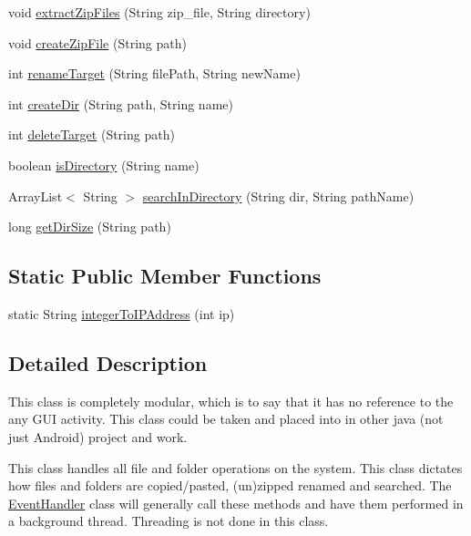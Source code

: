 \begin{DoxyCompactItemize}
\item 
void \hyperlink{classcom_1_1zia_1_1freshdocs_1_1widget_1_1fileexplorer_1_1_file_manager_a8aeb681e45fcce92cc4060ca7139d07d}{extract\-Zip\-Files} (String zip\-\_\-file, String directory)
\item 
void \hyperlink{classcom_1_1zia_1_1freshdocs_1_1widget_1_1fileexplorer_1_1_file_manager_a34589f8be3c60e24457dfa4f4278ef9a}{create\-Zip\-File} (String path)
\item 
int \hyperlink{classcom_1_1zia_1_1freshdocs_1_1widget_1_1fileexplorer_1_1_file_manager_a3f30e730f97184e178ece5f1f472b2d4}{rename\-Target} (String file\-Path, String new\-Name)
\item 
int \hyperlink{classcom_1_1zia_1_1freshdocs_1_1widget_1_1fileexplorer_1_1_file_manager_a6bc5e607bdd04f826f9f1a4a26490373}{create\-Dir} (String path, String name)
\item 
int \hyperlink{classcom_1_1zia_1_1freshdocs_1_1widget_1_1fileexplorer_1_1_file_manager_a820b0bdac17374cb719e83f24fcecfb9}{delete\-Target} (String path)
\item 
boolean \hyperlink{classcom_1_1zia_1_1freshdocs_1_1widget_1_1fileexplorer_1_1_file_manager_aa51edb6094808b3350dd9e91bd2a45c5}{is\-Directory} (String name)
\item 
Array\-List$<$ String $>$ \hyperlink{classcom_1_1zia_1_1freshdocs_1_1widget_1_1fileexplorer_1_1_file_manager_ad5d5eefe857f98bc934fe4d99c54a26f}{search\-In\-Directory} (String dir, String path\-Name)
\item 
long \hyperlink{classcom_1_1zia_1_1freshdocs_1_1widget_1_1fileexplorer_1_1_file_manager_a4bb3ac0f6b08ad04e3c6d78076ab10f5}{get\-Dir\-Size} (String path)
\end{DoxyCompactItemize}
\subsection*{Static Public Member Functions}
\begin{DoxyCompactItemize}
\item 
static String \hyperlink{classcom_1_1zia_1_1freshdocs_1_1widget_1_1fileexplorer_1_1_file_manager_aecf1482512be0ca7749b868780d9493f}{integer\-To\-I\-P\-Address} (int ip)
\end{DoxyCompactItemize}


\subsection{Detailed Description}
This class is completely modular, which is to say that it has no reference to the any G\-U\-I activity. This class could be taken and placed into in other java (not just Android) project and work. \par
 \par
 This class handles all file and folder operations on the system. This class dictates how files and folders are copied/pasted, (un)zipped renamed and searched. The \hyperlink{classcom_1_1zia_1_1freshdocs_1_1widget_1_1fileexplorer_1_1_event_handler}{Event\-Handler} class will generally call these methods and have them performed in a background thread. Threading is not done in this class. 

